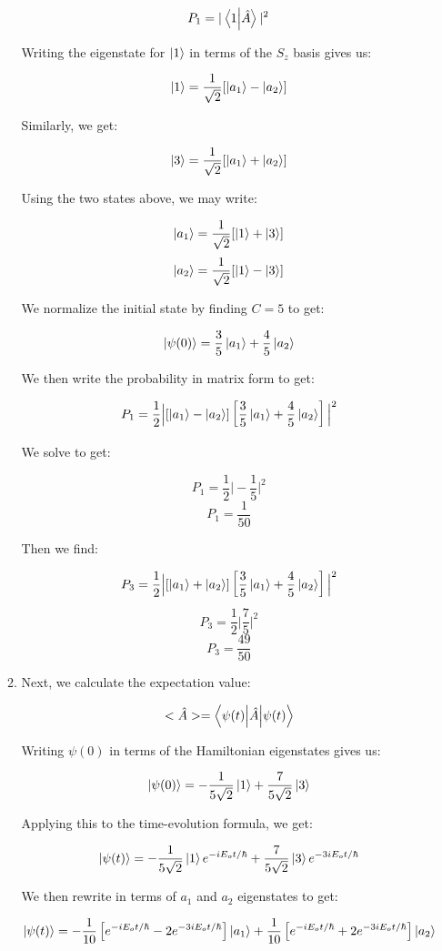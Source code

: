 \begin{enumerate}
\begin{enumerate}
        $$P_{1}=|\bra{1}\ket{\hat{A}}|^2$$

        Writing the eigenstate for $\ket{1}$ in terms of the $S_z$ basis gives us:

        $$\ket{1}=\frac{1}{\sqrt{2}}[\ket{a_1}-\ket{a_2}]$$

        Similarly, we get:

        $$\ket{3}=\frac{1}{\sqrt{2}}[\ket{a_1}+\ket{a_2}]$$

        Using the two states above, we may write:

        $$\ket{a_1}=\frac{1}{\sqrt{2}}[\ket{1}+\ket{3}]$$
        $$\ket{a_2}=\frac{1}{\sqrt{2}}[\ket{1}-\ket{3}]$$

        We normalize the initial state by finding $C=5$ to get:

        $$\ket{\psi(0)}=\frac{3}{5}\ket{a_1}+\frac{4}{5}\ket{a_2}$$

        We then write the probability in matrix form to get:

        $$P_1=\frac{1}{2}\Big|[\ket{a_1}-\ket{a_2}]\left[ \frac{3}{5}\ket{a_1}+\frac{4}{5}\ket{a_2} \right]\Big|^2$$

        We solve to get:

        $$P_1=\frac{1}{2}\Big|-\frac{1}{5}\Big|^2$$
        $$\boxed{P_1=\frac{1}{50}}$$

        Then we find:

        $$P_3=\frac{1}{2}\Big|[\ket{a_1}+\ket{a_2}]\left[ \frac{3}{5}\ket{a_1}+\frac{4}{5}\ket{a_2} \right]\Big|^2$$
        $$P_3=\frac{1}{2}\Big|\frac{7}{5}\Big|^2$$
        $$\boxed{P_3=\frac{49}{50}}$$

      \item Next, we calculate the expectation value:

        $$<\hat{A}>=\bra{\psi(t)\Big|\hat{A}}\ket{\psi(t)}$$

        Writing $\psi(0)$ in terms of the Hamiltonian eigenstates gives us:

        $$\ket{\psi(0)}=-\frac{1}{5\sqrt{2}}\ket{1}+\frac{7}{5\sqrt{2}}\ket{3}$$

        Applying this to the time-evolution formula, we get:

        $$\ket{\psi(t)}=-\frac{1}{5\sqrt{2}}\ket{1}e^{-iE_ot/\hbar}+\frac{7}{5\sqrt{2}}\ket{3}e^{-3iE_ot/\hbar}$$

        We then rewrite in terms of $a_1$ and $a_2$ eigenstates to get:

        $$\ket{\psi(t)}=-\frac{1}{10}\left[e^{-iE_ot/\hbar}-2e^{-3iE_ot/\hbar}\right]\ket{a_1}+\frac{1}{10}\left[e^{-iE_ot/\hbar}+2e^{-3iE_ot/\hbar}\right]\ket{a_2}$$


\end{enumerate}
\end{enumerate}

